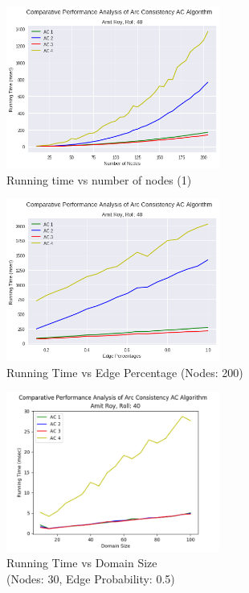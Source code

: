 \documentclass[12pt , conference]{IEEEtran}
\begin{document}
	\noindent
	\begin{figure}[h]
		\centering
		\includegraphics[width=7cm]{running_time_node_200.png}
		\captionsetup{singlelinecheck = false, format= hang,  font=footnotesize, labelsep=space}
		\caption{Running time vs number of nodes (1)}
		\label{figure 1}
	\end{figure}
	
	
	\begin{figure}[h]
		\centering
		\includegraphics[width=7cm]{running_time_edge_200.png}
		\captionsetup{singlelinecheck = false, format= hang,  font=footnotesize, labelsep=space}
		\caption{Running Time vs Edge Percentage  (Nodes: 200)}
		\label{figure 2}
	\end{figure}



		\begin{figure}[h]
		\centering
		\includegraphics[width=7cm]{domain_size.png}
		\captionsetup{singlelinecheck = false, format= hang,  font=footnotesize, labelsep=space}
		\caption{Running Time vs Domain Size\\ (Nodes: 30, Edge Probability: 0.5)}
		\label{figure 3}
	\end{figure}
	
\end{document}
